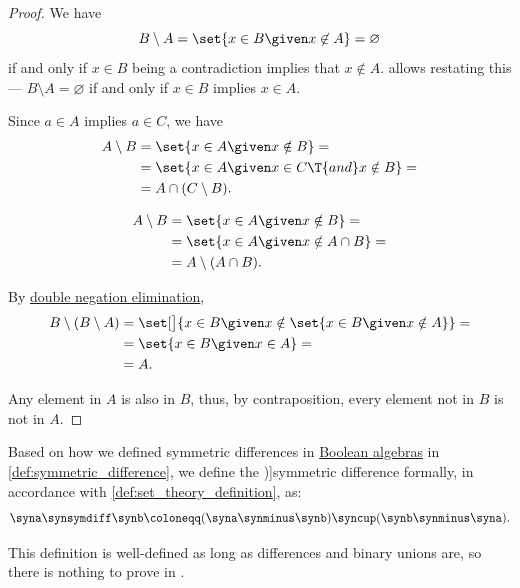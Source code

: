 \begin{proof}
   We have
  \begin{equation*}
    B \setminus A = \set{ x \in B \given x \not\in A } = \varnothing
  \end{equation*}
  if and only if \( x \in B \) being a contradiction implies that \( x \not\in A \).  allows restating this --- \( B \setminus A = \varnothing \) if and only if \( x \in B \) implies \( x \in A \).

   Since \( a \in A \) implies \( a \in C \), we have
  \begin{align*}
    A \setminus B
    &=
    \set{ x \in A \given x \notin B }
    = \\ &=
    \set{ x \in A \given x \in C \T{and} x \notin B }
    = \\ &=
    A \cap (C \setminus B).
  \end{align*}

  \begin{align*}
    A \setminus B
    &=
    \set{ x \in A \given x \notin B }
    = \\ &=
    \set{ x \in A \given x \notin A \cap B }
    = \\ &=
    A \setminus (A \cap B).
  \end{align*}

   By \hyperref[thm:propositional_semantic_dne]{double negation elimination},
  \begin{align*}
    B \setminus (B \setminus A)
    &=
    \set[\big]{ x \in B \given x \notin \set{ x \in B \given x \notin A } }
    = \\ &=
    \set{ x \in B \given x \in A }
    = \\ &=
    A.
  \end{align*}

   Any element in \( A \) is also in \( B \), thus, by contraposition, every element not in \( B \) is not in \( A \).
\end{proof}

\begin{definition}\label{def:set_symmetric_difference}
  Based on how we defined symmetric differences in \hyperref[def:boolean_algebra]{Boolean algebras} in \cref{def:symmetric_difference}, we define the \term[ru=симметричная разность (\cite[7]{ШеньВерещагин2020НачалаТеорииМножеств})]{symmetric difference} formally, in accordance with \cref{def:set_theory_definition}, as:
  \begin{equation*}
    \syna \synsymdiff \synb \coloneqq (\syna \synminus \synb) \syncup (\synb \synminus \syna).
  \end{equation*}
\end{definition}
\begin{comments}
  \item This definition is well-defined as long as differences and binary unions are, so there is nothing to prove in \hyperref[def:zfc]{}.
\end{comments}

